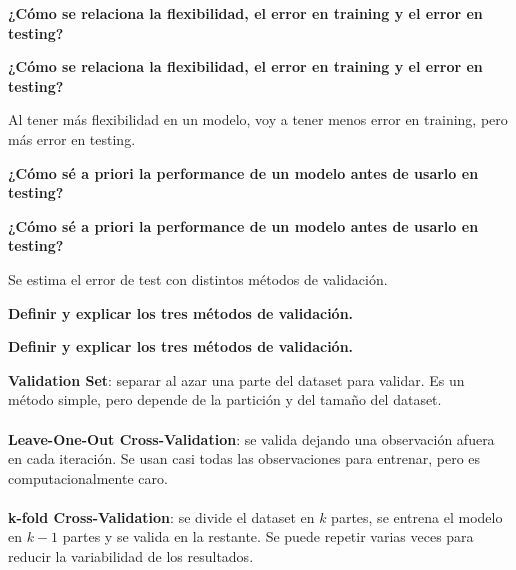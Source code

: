 \documentclass[10pt]{memoir}
\begin{document}
\clearpage
\begin{center}
	\textbf{\Large ¿Cómo se relaciona la flexibilidad, el error en training y el error en testing?} \\
\end{center}

\clearpage
\begin{center}
	\textbf{\Large ¿Cómo se relaciona la flexibilidad, el error en training y el error en testing?} \\
\end{center}
\noindent Al tener más flexibilidad en un modelo, voy a tener menos error en training, pero más error en testing.

\clearpage
\begin{center}
	\textbf{\Large ¿Cómo sé a priori la performance de un modelo antes de usarlo en testing?} \\
\end{center}

\clearpage
\begin{center}
	\textbf{\Large ¿Cómo sé a priori la performance de un modelo antes de usarlo en testing?} \\
\end{center}
\noindent Se estima el error de test con distintos métodos de validación.

\clearpage
\begin{center}
	\textbf{\Large Definir y explicar los tres métodos de validación.} \\
\end{center}

\clearpage
\begin{center}
	\textbf{\Large Definir y explicar los tres métodos de validación.} \\
\end{center}
\noindent \textbf{Validation Set}: separar al azar una parte del dataset para validar. Es un método simple, pero depende de la partición y del tamaño del dataset. \\
\\
\noindent \textbf{Leave-One-Out Cross-Validation}: se valida dejando una observación afuera en cada iteración. Se usan casi todas las observaciones para entrenar, pero es computacionalmente caro. \\
\\
\noindent \textbf{k-fold Cross-Validation}: se divide el dataset en $k$ partes, se entrena el modelo en $k-1$ partes y se valida en la restante. Se puede repetir varias veces para reducir la variabilidad de los resultados.
\end{document}
